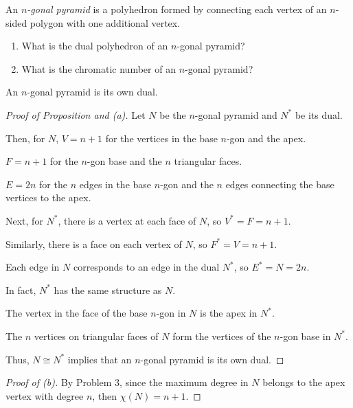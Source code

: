 \documentclass[../hw7]{subfiles}
\begin{document}
\begin{problem}
\item An \emph{$n$-gonal pyramid} is a polyhedron formed by connecting each vertex of an $n$-sided polygon with one additional vertex.
\begin{enumerate}
	\item What is the dual polyhedron of an $n$-gonal pyramid?
	\item What is the chromatic number of an $n$-gonal pyramid?
\end{enumerate}
\end{problem}
\begin{proposition}
	An $n$-gonal pyramid is its own dual.
\end{proposition}
\begin{proof}[Proof of Proposition and (a)]
	Let $N$ be the $n$-gonal pyramid and  $N^*$ be its dual.

	Then, for  $N$, $V=n+1$ for the vertices in the base  $n$-gon and the apex.

	$F=n+1$ for the  $n$-gon base and the $n$ triangular faces.

	$E=2n$ for the  $n$ edges in the base $n$-gon and the  $n$  edges connecting the base vertices to the apex.

	Next, for $N^*$, there is a vertex at each face of  $N$, so $V^*=F=n+1$.

	Similarly, there is a face on each vertex of  $N$, so  $F^*=V=n+1$.

	Each edge in $N$ corresponds to an edge in the dual $N^*$, so  $E^*=N=2n$.

	In fact,  $N^*$  has the same structure as $N$.

	The vertex in the face of the base $n$-gon in  $N$ is the apex in  $N^*$.

	The  $n$ vertices on triangular faces of $N$ form the vertices of the $n$-gon base in  $N^*$.

	Thus,  $N\cong N^* $ implies that an $n$-gonal pyramid is its own dual.
\end{proof}
\begin{proof}[Proof of (b)]
	By Problem 3, since the maximum degree in $N$ belongs to the apex vertex with  degree $n$, then $\chi(N)=n+1$.
\end{proof}
\end{document}
